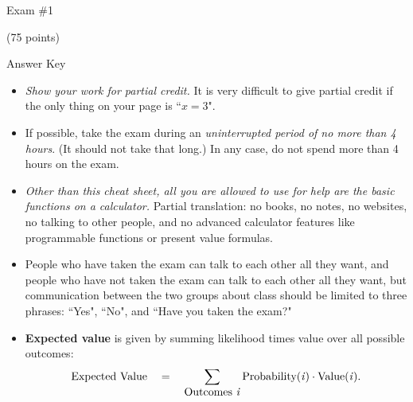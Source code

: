 \documentclass[twoside]{article}
\begin{document}
\pagestyle{empty}
\thispagestyle{empty}

\vspace*{-1cm}
\enlargethispage{4\baselineskip}
\begin{center}
\Large Exam \#1 \begin{EXAM}(75 points)\end{EXAM} \begin{KEY} Answer Key \end{KEY}
\end{center}
\normalsize
\bigskip

\begin{EXAM}

\begin{itemize}
\begin{comment}
\item Other than this cheat sheet (which you should tear off), all you are allowed to use for help are the basic
functions on a calculator.

\item The space provided below each question should be sufficient for your answer, but you can use additional paper if
needed.
\end{comment}

\item \emph{Show your work for partial credit.} It is very difficult to give partial credit if the only thing on your
page is ``$x=3$".


\item If possible, take the exam during an \emph{uninterrupted period of no more than 4 hours}. (It should not take that long.) In any case, do not spend more than 4 hours on the exam.

\item \emph{Other than this cheat sheet, all you are allowed to use for help are the basic functions on a calculator.}
Partial translation: no books, no notes, no websites, no talking to other people, and no advanced calculator features
like programmable functions or present value formulas.

\item People who have taken the exam can talk to each other all they want, and people who have not taken the exam can
talk to each other all they want, but communication between the two groups about class should be limited to three
phrases: ``Yes", ``No", and ``Have you taken the exam?"


\item \textbf{Expected value} is given by summing likelihood times value over all possible outcomes:
\[
\mbox{Expected Value}\ \ \  = \ \ \ \sum_{\mbox{Outcomes \emph{i}}} \mbox{Probability(\emph{i})} \cdot
\mbox{Value(\emph{i})}.
\]



\end{itemize}
\end{EXAM}
\end{document}
